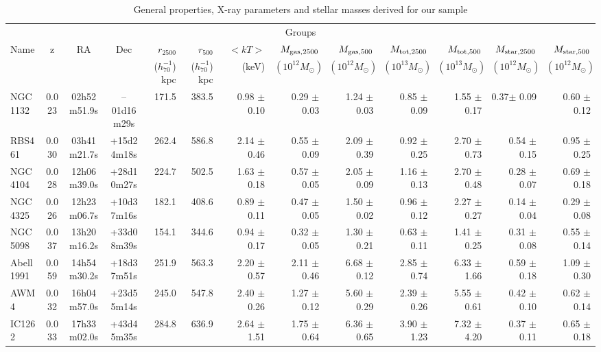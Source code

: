 \documentclass{aa}
\begin{document}
\onecolumn
\begin{landscape}
\scriptsize
\setlength{\tabcolsep}{5pt}
\begin{longtable}{lcccrrrrrrrrr}
\caption{\label{tab:geral} General properties, X-ray parameters and stellar masses derived for our sample}\\
\hline\hline
\multicolumn{13}{c}{Groups}\\
Name & z & RA & Dec &$r_{2500}$ &$r_{500}$& $ <kT> $ & $M_{\rm gas,2500} $ &  $M_{\rm gas,500} $ &  $M_{\rm tot,2500} $ &  $M_{\rm tot,500} $ &    $M_{\rm star,2500} $ &  $M_{\rm star,500} $\\
 & & & & ($h_{70}^{-1}$) kpc & ($h_{70}^{-1}$) kpc &(keV) & $(10^{12} M_{\odot})$ & $(10^{12} M_{\odot})$ & $(10^{13} M_{\odot})$ & $(10^{13} M_{\odot})$ & $(10^{12} M_{\odot})$ & $(10^{12} M_{\odot})$\\
 \hline 
NGC1132   	& 0.023 & 02h52m51.9s & --01d16m29s& 171.5 &383.5 & 0.98 $\pm$ 0.10 & 0.29 $\pm$ 0.03 &1.24 $\pm$ 0.03& 0.85 $\pm$ 0.09 &1.55 $\pm$ 0.17&  0.37$\pm$  0.09& 0.60 $\pm$ 0.12 \\
RBS461    	& 0.030 & 03h41m21.7s & +15d24m18s& 262.4 &586.8 & 2.14 $\pm$ 0.46 & 0.55 $\pm$ 0.09 &2.09 $\pm$ 0.39& 0.92 $\pm$ 0.25 &2.70 $\pm$ 0.73&  0.54  $\pm$  0.15 & 0.95 $\pm$ 0.25 \\
NGC4104   	& 0.028 & 12h06m39.0s & +28d10m27s& 224.7 &502.5 & 1.63 $\pm$ 0.18 & 0.57 $\pm$ 0.05 &2.05 $\pm$ 0.09& 1.16 $\pm$ 0.13 &2.70 $\pm$ 0.48&  0.28 $\pm$  0.07 & 0.69 $\pm$0.18  \\
NGC4325   	& 0.026 & 12h23m06.7s & +10d37m16s& 182.1 &408.6 & 0.89 $\pm$ 0.11 & 0.47 $\pm$ 0.05 &1.50 $\pm$ 0.02& 0.96 $\pm$ 0.12 &2.27 $\pm$ 0.27&  0.14 $\pm$  0.04 & 0.29 $\pm$ 0.08 \\
NGC5098   	& 0.037 & 13h20m16.2s & +33d08m39s& 154.1 &344.6 & 0.94 $\pm$ 0.17 & 0.32 $\pm$ 0.05 &1.30 $\pm$ 0.21& 0.63 $\pm$ 0.11 &1.41 $\pm$ 0.25&  0.31 $\pm$  0.08 & 0.55 $\pm$ 0.14 \\
Abell1991		& 0.059 & 14h54m30.2s & +18d37m51s& 251.9 &563.3 & 2.20 $\pm$ 0.57 & 2.11 $\pm$ 0.46 &6.68 $\pm$ 0.12& 2.85 $\pm$ 0.74 &6.33 $\pm$ 1.66&  0.59 $\pm$  0.18 & 1.09 $\pm$ 0.30 \\
AWM4 	  	& 0.032 & 16h04m57.0s & +23d55m14s& 245.0 &547.8 & 2.40 $\pm$ 0.26 & 1.27 $\pm$ 0.12 &5.60 $\pm$ 0.29& 2.39 $\pm$ 0.26 &5.55 $\pm$ 0.61&  0.42 $\pm$  0.10 & 0.62 $\pm$ 0.14 \\
IC1262 	  	& 0.033 & 17h33m02.0s & +43d45m35s& 284.8 &636.9 & 2.64 $\pm$ 1.51 & 1.75 $\pm$ 0.64 &6.36 $\pm$ 0.65& 3.90 $\pm$ 1.23 &7.32 $\pm$ 4.20&  0.37 $\pm$  0.11 & 0.65 $\pm$ 0.18 \\

\end{longtable}
\end{landscape}
\end{document}
